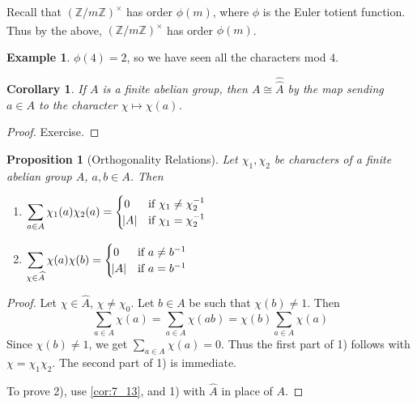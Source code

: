 \documentclass[11pt]{article}
\theoremstyle{definition}
\newtheorem{example}[definition]{Example}
\theoremstyle{plain}
\newtheorem{proposition}[definition]{Proposition}
\newtheorem{corollary}[definition]{Corollary}
\theoremstyle{remark}
\newcommand{\ZZ}{\mathbb{Z}}
\begin{document}
Recall that $(\ZZ/m\ZZ)^\times$ has order $\phi(m)$, where $\phi$ is the Euler totient function. Thus by the above, $\widehat{(\ZZ/m\ZZ)^\times}$ has order $\phi(m)$.

\begin{example}\label{eg:7_12}
    $\phi(4) = 2$, so we have seen all the characters mod $4$.
\end{example}

\begin{corollary}\label{cor:7_13}
    If $A$ is a finite abelian group, then $A \cong \hat{\hat{A}}$ by the map sending $a \in A$ to the character $\chi \mapsto \chi(a)$.
\end{corollary}
\begin{proof}
    Exercise.
\end{proof}

\begin{proposition}[Orthogonality Relations]\label{prop:7_14}
    Let $\chi_1, \chi_2$ be characters of a finite abelian group $A$, $a, b \in A$. Then
    \begin{enumerate}
        \item $\displaystyle\sum_{a \in A} \chi_1(a) \chi_2(a) =
                \begin{cases}
                    0 & \text{if } \chi_1 \neq \chi_2^{-1}\\
                    \abs{A} & \text{if } \chi_1 = \chi_2^{-1}
                \end{cases}$
        \item $\displaystyle\sum_{\chi \in \widehat{A}} \chi(a) \chi(b) =
                \begin{cases}
                    0 & \text{if } a \neq b^{-1}\\
                    \abs{A} & \text{if } a = b^{-1}
                \end{cases}$
    \end{enumerate}
\end{proposition}
\begin{proof}
    Let $\chi \in \widehat{A}$, $\chi \neq \chi_0$. Let $b \in A$ be such that $\chi(b) \neq 1$. Then
    \begin{equation*}
        \sum_{a \in A} \chi(a) = \sum_{a \in A} \chi(ab) = \chi(b) \sum_{a \in A} \chi(a)
    \end{equation*}
    Since $\chi(b) \neq 1$, we get $\sum_{a \in A} \chi(a) = 0$. Thus the first part of 1) follows with $\chi = \chi_1 \chi_2$. The second part of 1) is immediate.

    To prove 2), use \autoref{cor:7_13}, and 1) with $\widehat{A}$ in place of $A$.
\end{proof}
\end{document}
